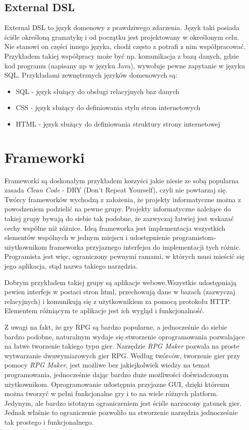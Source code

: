 \documentclass[openright]{xmgr}
\begin{document}
\subsection{External DSL}

External DSL to język domenowy z prawdziwego zdarzenia. Język taki posiada ściśle określoną gramatykę i od początku jest projektowany w określonym celu. Nie stanowi on części innego języka, chodź często z potrafi z nim współpracować. Przykładem takiej współpracy może być np. komunikacja z bazą danych, gdzie kod programu (napisany np w języku Java), wywołuje pewne zapytanie w języku SQL. Przykładami zewnętrznych języków domenowych są:
\begin{itemize}
	\item SQL - język służący do obsługi relacyjnych baz danych
	\item CSS - język służący do definiowania stylu stron internetowych 
	\item HTML - język służący do definiowania struktury strony internetowej
\end{itemize}

\section{Frameworki}

Frameworki są doskonałym przykładem korzyści jakie niesie ze sobą popularna zasada \textit{Clean Code} \cite{CleanCode:2005} - DRY (Don't Repeat Yourself), czyli nie powtarzaj się. 
Twórcy frameworków  wychodzą z założenia, że projekty informatyczne można z powodzeniem podzielić na pewne grupy. Projekty informatyczne należące do takiej grupy bywają do siebie tak podobne, że zazwyczaj łatwiej jest wskazać cechy wspólne niż różnice. Ideą frameworka jest implementacja wszystkich elementów wspólnych w jednym miejscu i udostępnienie programistom-użytkownikom frameworka przyjaznego interfejsu do implementacji tych różnic. Programista jest więc, ograniczony pewnymi ramami, w których musi mieścić się jego aplikacja, stąd nazwa takiego narzędzia.

Dobrym przykładem takiej grupy są aplikacje webowe.Wszystkie udostępniają pewien interfejs w postaci stron html, przechowują dane w bazach (zazwyczaj relacyjnych) i komunikują się z użytkownikiem za pomocą protokołu HTTP. Elementem różniącym te aplikacje jest ich wygląd i funkcjonalność. 

Z uwagi na fakt, że gry RPG są bardzo popularne, a jednocześnie do siebie bardzo podobne, naturalnym wydaje się stworzenie oprogramowania pozwalające na łatwe tworzenie takiego typu gier. Narzędzie \textit{RPG Maker} \cite{RPGMaker:2017:Doc} pozwala na proste wytwarzanie dwuwymiarowych gier RPG. Według twórców, tworzenie gier przy pomocy \textit{RPG Maker}, jest możliwe bez jakiejkolwiek wiedzy na temat programowania, jednocześnie dając bardzo duże możliwości doświadczonym użytkownikom. Oprogramowanie udostępnia przyjazne GUI, dzięki któremu można tworzyć w pełni funkcjonalne gry i to na wiele różnych platform. Jedynym, ale bardzo istotnym ograniczeniem jest ściśle narzucony gatunek gier. Jednak właśnie to ograniczenie pozwoliło na stworzenie narzędzia jednocześnie tak prostego i funkcjonalnego. 
\end{document}
